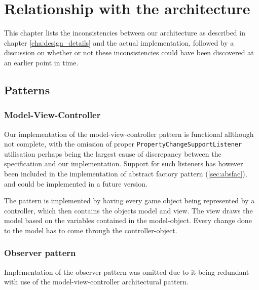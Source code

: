 \chapter{Relationship with the architecture}
\label{cha:relationship_with_the_architecture}

This chapter lists the inconsistencies between our architecture as described in chapter \ref{cha:design_details} and the actual implementation, followed by a discussion on whether or not these inconsistencies could have been discovered at an earlier point in time.



\section{Patterns}
\label{sec:patters}

\subsection{Model-View-Controller}
\label{sec:mvc}

Our implementation of the model-view-controller pattern is functional allthough not complete, with the omission of proper \texttt{PropertyChangeSupportListener} utilisation perhaps being the largest cause of discrepancy between the specification and our implementation.
Support for such listeners has however been included in the implementation of abstract factory pattern (\ref{sec:absfac}), and could be implemented in a future version.

The pattern is implemented by having every game object being represented by a controller, which then contains the objects model and view. The view draws the model based on the variables contained in the model-object. Every change done to the model has to come through the controller-object.




\subsection{Observer pattern}
Implementation of the observer pattern was omitted due to it being redundant with use of the model-view-controller architectural pattern.

